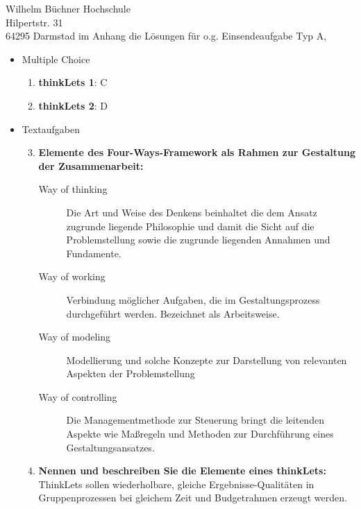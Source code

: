 \documentclass[
    version=last,           %
    DIV=13,                 %
    BCOR=0mm,               %
    paper=a4,               %
    fontsize=12pt,          %
    firsthead=on,           %
    firstfoot=on,           %
    pagenumber=on,i         %
    parskip=half,           %
    enlargefirstpage=,      %
    firsthead=on,           %
    fromrule=afteraddress,  %
    priority=off,           %
    backaddress=true,       %
    refline=dateright,      %
	fromalign=right,	    %
    fromemail=on,i          %
    fromurl=on,             %
    frombank=on,
    fromphone=on,           %
    frommobilephone=on      %
    fromlogo=on,            %
    addrfield=on,           %
    subject=untitled,  %
    foldmarks=off,          %
    numericaldate=off,      %
	pagenumber=right,	        %
	parskip=half,	        %
    headsep=false,          %
    footsepline=true,       %
    foldmarks=off,		    %
	]{scrlttr2}
\begin{document}
\begin{letter} {Wilhelm Büchner Hochschule \\
Hilpertstr. 31\\
64295 Darmstad}
im Anhang die Lösungen für o.g. Einsendeaufgabe Typ A,
\\
\begin{itemize}
    \item Multiple Choice
        \begin{enumerate}
        \item \textbf{thinkLets 1}: C \\
        \item \textbf{thinkLets 2}: D \\
        \end{enumerate}
            \vspace{1cm}
    \item Textaufgaben
        \begin{enumerate}
        \setcounter{enumi}{2}
        \item \textbf{Elemente des Four-Ways-Framework als Rahmen zur
            Gestaltung der Zusammenarbeit:} \\
            \begin{description}
                \item[Way of thinking]
                    Die Art und Weise des Denkens beinhaltet die dem Ansatz
                    zugrunde liegende Philosophie und damit die Sicht auf die
                    Problemstellung sowie die zugrunde liegenden Annahmen und
                    Fundamente.
                \item [Way of working]
                    Verbindung möglicher Aufgaben, die im Gestaltungsprozess
                    durchgeführt werden. Bezeichnet als  Arbeitsweise.
                 \item [Way of modeling]
                    Modellierung und solche Konzepte zur Darstellung von
                    relevanten Aspekten der Problemstellung
                \item [Way of controlling] Die Managementmethode zur Steuerung
                    bringt die leitenden Aspekte wie Maßregeln und Methoden zur
                    Durchführung eines Gestaltungsansatzes.
            \end{description}
            \vspace{1cm}
            \item \textbf{ Nennen und beschreiben Sie die Elemente eines
                thinkLets:} \\
                ThinkLets sollen wiederholbare, gleiche Ergebnisse-Qualitäten in
                Gruppenprozessen bei gleichem Zeit und Budgetrahmen erzeugt werden.

\end{enumerate}
\end{itemize}
\end{letter}
\end{document}
